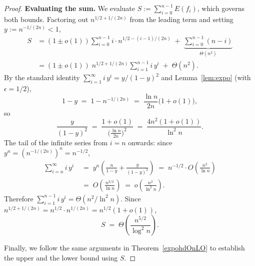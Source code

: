 \begin{proof}
\medskip
\noindent\textbf{Evaluating the sum.}
We evaluate $S := \sum_{i=0}^{n-1} E(f_i)$, which governs both bounds.
Factoring out $n^{1/2+1/(2n)}$ from the leading term and setting
$y:=n^{-1/(2n)}<1$,
\begin{align*}
S
&= (1\pm o(1))\sum_{i=0}^{n-1} i\cdot n^{1/2-(i-1)/(2n)}
   \;+\;\underbrace{\sum_{i=0}^{n-1}(n-i)}_{\Theta(n^2)} \\
&= (1\pm o(1))\;n^{1/2+1/(2n)}\sum_{i=1}^{n-1} i\,y^{i}
   \;+\;\Theta(n^2).
\end{align*}
By the standard identity $\sum_{i=1}^{\infty} i\,y^i = y/(1-y)^2$
and Lemma~\ref{lem:expo} (with $\epsilon=1/2$),
\[
1-y \;=\; 1 - n^{-1/(2n)}
    \;=\; \frac{\ln n}{2n}\bigl(1+o(1)\bigr),
\]
so
\[
\frac{y}{(1-y)^2}
\;=\; \frac{1+o(1)}{\bigl(\frac{\ln n}{2n}\bigr)^2}
\;=\; \frac{4n^2(1+o(1))}{\ln^2 n}.
\]
The tail of the infinite series from $i=n$ onwards:
since $y^n = (n^{-1/(2n)})^n = n^{-1/2}$,
\begin{align*}
\sum_{i=n}^{\infty} i\,y^i
\;&=\; y^n\!\left(\frac{n}{1-y}+\frac{y}{(1-y)^2}\right)
\;=\; n^{-1/2}\cdot O\!\left(\frac{n^2}{\ln n}\right)
\\\;&=\; O\!\left(\frac{n^{3/2}}{\ln n}\right)
\;=\; o\!\left(\frac{n^2}{\ln^2 n}\right).
\end{align*}
Therefore $\sum_{i=1}^{n-1} i\,y^{i} = \Theta(n^2/\ln^2 n)$.
Since $n^{1/2+1/(2n)} = n^{1/2}\cdot n^{1/(2n)} = n^{1/2}(1+o(1))$,
\begin{equation}\label{eq:S-expoHD}
S \;=\; \Theta\!\left(\frac{n^{5/2}}{\log^2 n}\right).
\end{equation}

Finally, we follow the same arguments in Theorem~\ref{expohdOnLO} to establish the upper and the lower bound using $S$.
%
%
\end{proof}


